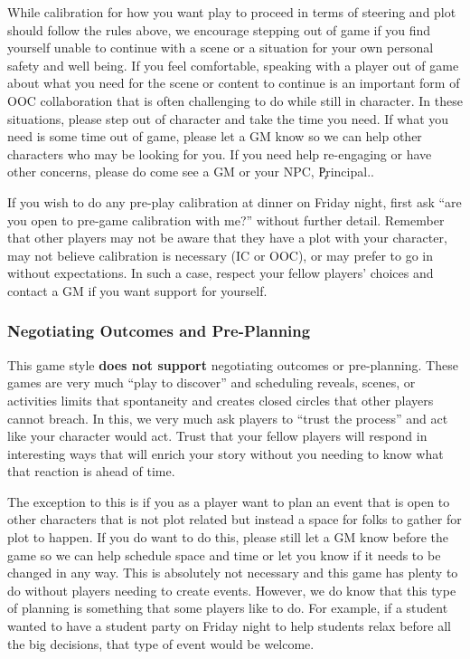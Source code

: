 \documentclass[sheet]{GL2020}
\begin{document}
While calibration for how you want play to proceed in terms of steering and plot should follow the rules above, we encourage stepping out of game if you find yourself unable to continue with a scene or a situation for your own personal safety and well being. If you feel comfortable, speaking with a player out of game about what you need for the scene or content to continue is an important form of OOC collaboration that is often challenging to do while still in character.  In these situations, please step out of character and take the time you need. If what you need is some time out of game, please let a GM know so we can help other characters who may be looking for you. If you need help re-engaging or have other concerns, please do come see a GM or your NPC, \c{Principal}{}..

If you wish to do any pre-play calibration at dinner on Friday night, first ask ``are you open to pre-game calibration with me?'' without further detail.  Remember that other players may not be aware that they have a plot with your character, may not believe calibration is necessary (IC or OOC), or may prefer to go in without expectations. In such a case, respect your fellow players' choices and contact a GM if you want support for yourself.

\subsubsection{Negotiating Outcomes and Pre-Planning}
This game style \textbf{does not support} negotiating outcomes or pre-planning. These games are very much ``play to discover'' and scheduling reveals, scenes, or activities limits that spontaneity and creates closed circles that other players cannot breach. In this, we very much ask players to ``trust the process'' and act like your character would act. Trust that your fellow players will respond in interesting ways that will enrich your story without you needing to know what that reaction is ahead of time.

The exception to this is if you as a player want to plan an event that is open to other characters that is not plot related but instead a space for folks to gather for plot to happen. If you do want to do this, please still let a GM know before the game so we can help schedule space and time or let you know if it needs to be changed in any way. This is absolutely not necessary and this game has plenty to do without players needing to create events. However, we do know that this type of planning is something that some players like to do. For example, if a student wanted to have a student party on Friday night to help students relax before all the big decisions, that type of event would be welcome.
\end{document}
